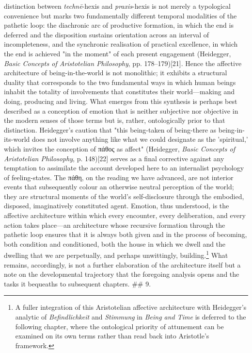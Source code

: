 \documentclass{article}
\begin{document}
distinction between \textit{technē}-hexis and \textit{praxis}-hexis is not merely a typological convenience but marks two fundamentally different temporal modalities of the pathetic loop: the diachronic arc of productive formation, in which the end is deferred and the disposition sustains orientation across an interval of incompleteness, and the synchronic realisation of practical excellence, in which the end is achieved "in the moment" of each present engagement (Heidegger, \textit{Basic Concepts of Aristotelian Philosophy}, pp. 178–179)[21]. Hence the affective architecture of being-in-the-world is not monolithic; it exhibits a structural duality that corresponds to the two fundamental ways in which human beings inhabit the totality of involvements that constitutes their world—making and doing, producing and living. What emerges from this synthesis is perhaps best described as a conception of emotion that is neither subjective nor objective in the modern senses of those terms but is, rather, ontologically prior to that distinction. Heidegger's caution that "this being-taken of being-there as being-in-its-world does not involve anything like what we could designate as the 'spiritual,' which invites the conception of πάθος as affect" (Heidegger, \textit{Basic Concepts of Aristotelian Philosophy}, p. 148)[22] serves as a final corrective against any temptation to assimilate the account developed here to an internalist psychology of feeling-states. The πάθη, on the reading we have advanced, are not interior events that subsequently colour an otherwise neutral perception of the world; they are structural moments of the world's self-disclosure through the embodied, disposed, imaginatively constituted agent. Emotion, thus understood, is the affective architecture within which every encounter, every deliberation, and every action takes place—an architecture whose recursive formation through the pathetic loop ensures that it is always both given and in the process of becoming, both condition and conditioned, both the house in which we dwell and the dwelling that we are perpetually, and perhaps unwittingly, building.\footnote{A fuller integration of this Aristotelian affective architecture with Heidegger's analytic of \textit{Befindlichkeit} and \textit{Stimmung} in \textit{Being and Time} is deferred to the following chapter, where the ontological priority of attunement can be examined on its own terms rather than read back into Aristotle's framework.} What remains, accordingly, is not a further elaboration of the architecture itself but a note on the developmental trajectory that the foregoing analysis opens and the tasks it bequeaths to subsequent chapters. ## 9. 
\end{document}
